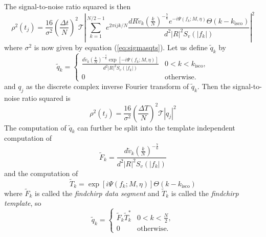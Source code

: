 The signal-to-noise ratio squared is then
\begin{equation}
\rho^2(t_j) = 
\frac{16}{\sigma^2}\left(\frac{\Delta t}{N}\right)^2 \mathcal{T}
\left| 
  \sum_{k=1}^{N/2-1} e^{2\pi ijk/N} 
  \frac{dR\tilde{v}_k \left(\frac{k}{N}\right)^{-\frac{7}{6}} e^{-i\Psi(f_k;M,\eta)}\Theta(k-k_\mathrm{isco})}
       {d^2|R|^2 S_v\left(\left|f_k\right|\right)}
\right|^2 
\label{eq:signaltonoisesq}
\end{equation}
where $\sigma^2$ is now given by equation (\ref{eq:sigmasqts}).  Let us define
$\tilde{q}_k$ by
\begin{equation}
\label{eq:qtildedef}
\tilde{q}_k = 
\begin{cases}
\frac{d\tilde{v}_k \left(\frac{k}{N}\right)^{-\frac{7}{6}} \exp\left[-i\Psi(f_k;M,\eta)\right]}
     {d^2|R|^2S_v\left(\left|f_k\right|\right)} & 0 < k < k_\mathrm{isco}, \\
0 & \text{otherwise}.
\end{cases}
\end{equation}
and $q_j$ as the discrete complex inverse Fourier transform of $\tilde{q}_k$. Then
the signal-to-noise ratio squared is
\begin{equation}
\rho^2(t_j) = \frac{16}{\sigma^2}\left(\frac{\Delta T}{N}\right)^2 \mathcal{T}
\left|q_j\right|^2
\end{equation}
The computation of $\tilde{q}_k$ can further be split into the template
independent computation of
\begin{equation}
\tilde{F}_k = \frac{d\tilde{v}_k \left(\frac{k}{N}\right)^{-\frac{7}{6}}}
{d^2|R|^2S_v\left(\left|f_k\right|\right)}
\end{equation}
and the computation of
\begin{equation}
\tilde{T}_k = \exp\left[i\Psi(f_k;M,\eta)\right] \Theta\left(k-k_\mathrm{isco}\right)
\end{equation}
where $\tilde{F}_k$ is called the \emph{findchirp data segment} and 
$\tilde{T}_k$ is called the \emph{findchirp template}, so
\begin{equation}
\tilde{q}_k = 
\begin{cases}
\tilde{F}_k \tilde{T}_k^\ast & 0 < k < \frac{N}{2},\\
0 & \text{otherwise}.
\end{cases}
\end{equation}

